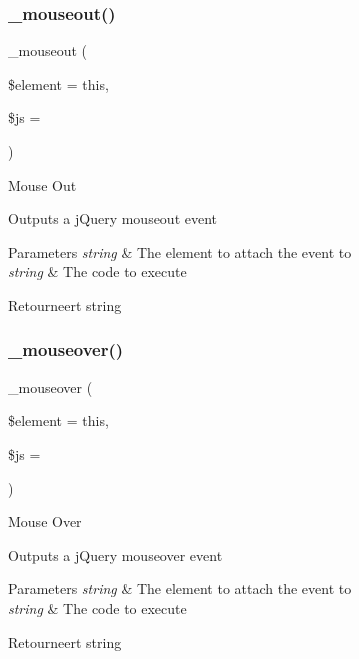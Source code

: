 \subsubsection{\texorpdfstring{\_mouseout()}{\_mouseout()}}
{\footnotesize\ttfamily \+\_\+mouseout (\begin{DoxyParamCaption}\item[{}]{\$element = {\ttfamily \textquotesingle{}this\textquotesingle{}},  }\item[{}]{\$js = {\ttfamily \textquotesingle{}\textquotesingle{}} }\end{DoxyParamCaption})\hspace{0.3cm}{\ttfamily [protected]}}

Mouse Out

Outputs a j\+Query mouseout event


\begin{DoxyParams}{Parameters}
{\em string} & The element to attach the event to \\
\hline
{\em string} & The code to execute \\
\hline
\end{DoxyParams}
\begin{DoxyReturn}{Retourneert}
string 
\end{DoxyReturn}
\mbox{\label{class_c_i___jquery_abe38c17415cf07abb6de435525676dca}} 
\subsubsection{\texorpdfstring{\_mouseover()}{\_mouseover()}}
{\footnotesize\ttfamily \+\_\+mouseover (\begin{DoxyParamCaption}\item[{}]{\$element = {\ttfamily \textquotesingle{}this\textquotesingle{}},  }\item[{}]{\$js = {\ttfamily \textquotesingle{}\textquotesingle{}} }\end{DoxyParamCaption})\hspace{0.3cm}{\ttfamily [protected]}}

Mouse Over

Outputs a j\+Query mouseover event


\begin{DoxyParams}{Parameters}
{\em string} & The element to attach the event to \\
\hline
{\em string} & The code to execute \\
\hline
\end{DoxyParams}
\begin{DoxyReturn}{Retourneert}
string 
\end{DoxyReturn}
\mbox{\label{class_c_i___jquery_a78d654cce0aaa6de766809e56b727261}} 
